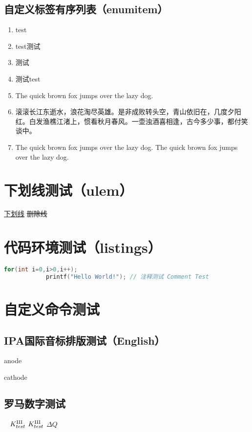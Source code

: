 \documentclass{../../PublicResources/DocClassLight}
\begin{document}
    \subsection{自定义标签有序列表（enumitem）}
    \begin{enumerate}[label={Step \arabic*.}]
        \item test
        \item test测试
        \item 测试
        \item 测试test
        \item The quick brown fox jumps over the lazy dog.
        \item 滚滚长江东逝水，浪花淘尽英雄。是非成败转头空，青山依旧在，几度夕阳红。白发渔樵江渚上，惯看秋月春风。一壶浊酒喜相逢，古今多少事，都付笑谈中。
        \item The quick brown fox jumps over the lazy dog. The quick brown fox jumps over the lazy dog.
    \end{enumerate}

    \section{下划线测试（ulem）}
    \uline{下划线}
    \sout{删除线}

    \section{代码环境测试（listings）}
    \begin{lstlisting}[language={C},title={\textsf{C语言代码段测试}}]
        for(int i=0,i>0,i++);
            printf("Hello World!"); // 注释测试 Comment Test
    \end{lstlisting}

    \section{自定义命令测试}
    \subsection{IPA国际音标排版测试（English）}
    anode 

    cathode 

    \subsection{罗马数字测试}
    \  $K_{test}^{\text{\Romannum{3}}}$ $K_{test}^{\mathrm{\Romannum{3}}}$ $\Delta Q$
\end{document}
